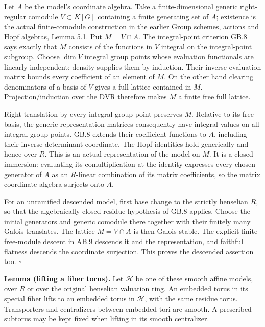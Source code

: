 \documentclass[
  11pt,
]{article}
\begin{document}
Let \(A\) be the model's coordinate algebra. Take a finite-dimensional
generic right-regular comodule \(V\subset K[G]\) containing a finite
generating set of \(A\); existence is the actual finite-comodule
construction in the earlier \href{../AG-GS/AG-GS-01.html}{Group schemes,
actions and Hopf algebras}, Lemma 5.1. Put \(M=V\cap A\). The
integral-point criterion GB.8 says exactly that \(M\) consists of the
functions in \(V\) integral on the integral-point subgroup. Choose
\(\dim V\) integral group points whose evaluation functionals are
linearly independent; density supplies them by induction. Their inverse
evaluation matrix bounds every coefficient of an element of \(M\). On
the other hand clearing denominators of a basis of \(V\) gives a full
lattice contained in \(M\). Projection/induction over the DVR therefore
makes \(M\) a finite free full lattice.

Right translation by every integral group point preserves \(M\).
Relative to its free basis, the generic representation matrices
consequently have integral values on all integral group points. GB.8
extends their coefficient functions to \(A\), including their
inverse-determinant coordinate. The Hopf identities hold generically and
hence over \(R\). This is an actual representation of the model on
\(M\). It is a closed immersion: evaluating its comultiplication at the
identity expresses every chosen generator of \(A\) as an \(R\)-linear
combination of its matrix coefficients, so the matrix coordinate algebra
surjects onto \(A\).

For an unramified descended model, first base change to the strictly
henselian \(R\), so that the algebraically closed residue hypothesis of
GB.8 applies. Choose the initial generators and generic comodule there
together with their finitely many Galois translates. The lattice
\(M=V\cap A\) is then Galois-stable. The explicit finite-free-module
descent in AB.9 descends it and the representation, and faithful
flatness descends the coordinate surjection. This proves the descended
assertion too. \(\square\)

\textbf{Lemma (lifting a fiber torus).} Let \(\mathcal H\) be one of
these smooth affine models, over \(R\) or over the original henselian
valuation ring. An embedded torus in its special fiber lifts to an
embedded torus in \(\mathcal H\), with the same residue torus.
Transporters and centralizers between embedded tori are smooth. A
prescribed subtorus may be kept fixed when lifting in its smooth
centralizer.
\end{document}
